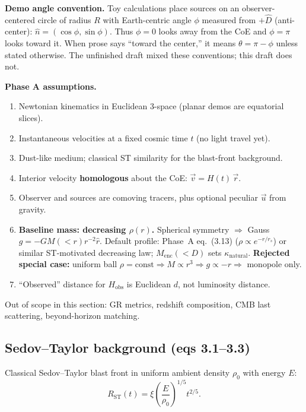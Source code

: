 \documentclass[11pt,a4paper]{article}
\begin{document}
\textbf{Demo angle convention.} Toy calculations place sources on an observer-centered circle of radius \(R\) with Earth-centric angle \(\phi\) measured from \(+\hat{D}\) (anti-center): \(\hat{n}=(\cos\phi,\sin\phi)\). Thus \(\phi=0\) looks away from the CoE and \(\phi=\pi\) looks toward it. When prose says ``toward the center,'' it means \(\theta=\pi-\phi\) unless stated otherwise. The unfinished draft mixed these conventions; this draft does not.

\textbf{Phase A assumptions.}
\begin{enumerate}
\item Newtonian kinematics in Euclidean 3-space (planar demos are equatorial slices).
\item Instantaneous velocities at a fixed cosmic time \(t\) (no light travel yet).
\item Dust-like medium; classical ST similarity for the blast-front background.
\item Interior velocity \textbf{homologous} about the CoE: \(\vec{v}=H(t)\,\vec{r}\).
\item Observer and sources are comoving tracers, plus optional peculiar \(\vec{u}\) from gravity.
\item \textbf{Baseline mass: decreasing \(\rho(r)\).} Spherical symmetry \(\Rightarrow\) Gauss \(g=-G M(<r) r^{-2}\hat{r}\). Default profile: Phase~A eq.~(3.13) (\(\rho\propto e^{-r/r_s}\)) or similar ST-motivated decreasing law; \(M_{\mathrm{enc}}(<D)\) sets \(\kappa_{\mathrm{natural}}\). \textbf{Rejected special case:} uniform ball \(\rho=\mathrm{const}\Rightarrow M\propto r^3\Rightarrow g\propto -r\Rightarrow\) monopole only.
\item ``Observed'' distance for \(H_{\mathrm{obs}}\) is Euclidean \(d\), not luminosity distance.
\end{enumerate}

Out of scope in this section: GR metrics, redshift composition, CMB last scattering, beyond-horizon matching.

\subsection{Sedov--Taylor background (eqs 3.1--3.3)}

Classical Sedov--Taylor blast front in uniform ambient density \(\rho_0\) with energy \(E\):
\begin{equation}
R_{\mathrm{ST}}(t)=\xi\left(\frac{E}{\rho_0}\right)^{1/5}t^{2/5}. \tag{3.1}\label{eq:3.1}
\end{equation}
\end{document}
